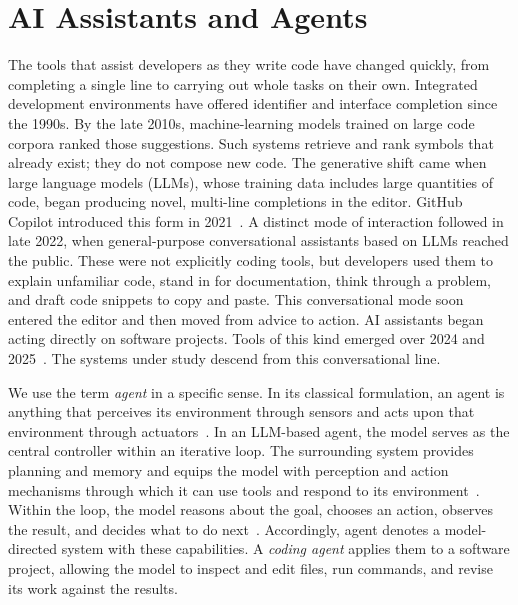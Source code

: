 
\section{AI Assistants and Agents}
\label{sec:background-ai-assistants-and-agents}

The tools that assist developers as they write code have changed quickly, from completing a single line to carrying out whole tasks on their own. Integrated development environments have offered identifier and interface completion since the 1990s. By the late 2010s, machine-learning models trained on large code corpora ranked those suggestions. Such systems retrieve and rank symbols that already exist; they do not compose new code. The generative shift came when large language models (LLMs), whose training data includes large quantities of code, began producing novel, multi-line completions in the editor. GitHub Copilot introduced this form in 2021~\cite{friedman2021copilot}. A distinct mode of interaction followed in late 2022, when general-purpose conversational assistants based on LLMs reached the public. These were not explicitly coding tools, but developers used them to explain unfamiliar code, stand in for documentation, think through a problem, and draft code snippets to copy and paste. This conversational mode soon entered the editor and then moved from advice to action. AI assistants began acting directly on software projects. Tools of this kind emerged over 2024 and 2025~\cite{wu2024devin,nikolic2025agentmode}. The systems under study descend from this conversational line.

We use the term \emph{agent} in a specific sense. In its classical formulation, an agent is anything that perceives its environment through sensors and acts upon that environment through actuators~\cite{russell2021aima}. In an LLM-based agent, the model serves as the central controller within an iterative loop. The surrounding system provides planning and memory and equips the model with perception and action mechanisms through which it can use tools and respond to its environment~\cite{liu2024llmagents}. Within the loop, the model reasons about the goal, chooses an action, observes the result, and decides what to do next~\cite{yao2023react}. Accordingly, agent denotes a model-directed system with these capabilities. A \emph{coding agent} applies them to a software project, allowing the model to inspect and edit files, run commands, and revise its work against the results.

